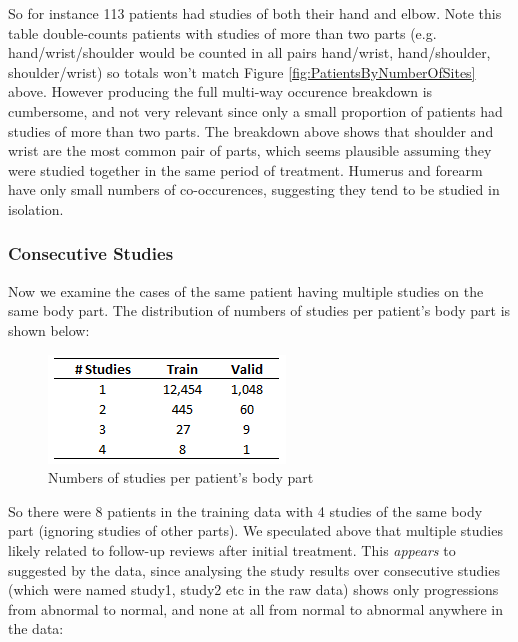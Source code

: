 \documentclass[11pt]{article} %
\theoremstyle{plain}
\theoremstyle{definition}
\begin{document}
\FloatBarrier
\noindent
So for instance 113 patients had studies of both their hand and elbow. Note this table double-counts patients with studies of more than two parts (e.g. hand/wrist/shoulder would be counted in all pairs hand/wrist, hand/shoulder, shoulder/wrist) so totals won't match Figure \ref{fig:PatientsByNumberOfSites} above. However producing the full multi-way occurence breakdown is cumbersome, and not very relevant since only a small proportion of patients had studies of more than two parts. The breakdown above shows that shoulder and wrist are the most common pair of parts, which seems plausible assuming they were studied together in the same period of treatment. Humerus and forearm have only small numbers of co-occurences, suggesting they tend to be studied in isolation.    

\subsubsection{Consecutive Studies}
Now we examine the cases of the same patient having multiple studies on the same body part. The distribution of numbers of studies per patient's body part is shown below: 
\begin{figure}[!ht]
    \centering    
    \caption{Numbers of studies per patient's body part}
    \label{fig:NumbersOfStudiesBySite}
    \includegraphics[scale=0.7]{MURA-Breakdowns/NumbersOfStudiesBySite.PNG}
\end{figure}
\FloatBarrier
\noindent
So there were 8 patients in the training data with 4 studies of the same body part (ignoring studies of other parts). We speculated above that multiple studies likely related to follow-up reviews after initial treatment. This \textit{appears} to suggested by the data, since analysing the study results over consecutive studies (which were named study1, study2 etc in the raw data) shows only progressions from abnormal to normal, and none at all from normal to abnormal anywhere in the data:
\end{document}
